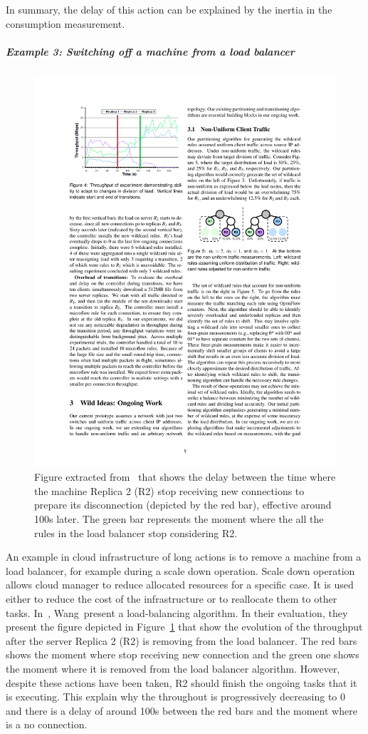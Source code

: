 In summary, the delay of this action can be explained by the inertia in the consumption measurement.

\subparagraph{Example 3: Switching off a machine from a load balancer}
\begin{figure}
	\centering
	\includegraphics[width=0.5\linewidth]{img/chapt-tkm/intro/load-balencer}
	\caption{Figure extracted from~\cite{DBLP:conf/nsdi/WangBR11} that shows the delay between the time where the machine Replica 2 (R2) stop receiving new connections to prepare its disconnection (depicted by the red bar), effective around 100s later. The green bar represents the moment where the all the rules in the load balancer stop considering R2.}
	\label{fig:tkm:intro:example-load-balencer}
	
\end{figure}


An example in cloud infrastructure of long actions is to remove a machine from a load balancer, for example during a scale down operation.
Scale down operation allows cloud manager to reduce allocated resources for a specific case.
It is used either to reduce the cost of the infrastructure or to reallocate them to other tasks.
In~\cite{DBLP:conf/nsdi/WangBR11}, Wang~\etal present a load-balancing algorithm.
In their evaluation, they present the figure depicted in Figure~\ref{fig:tkm:intro:example-load-balencer} that show the evolution of the throughput after the server Replica 2 (R2) is removing from the load balancer.
The red bars shows the moment where stop receiving new connection and the green one shows the moment where it is removed from the load balancer algorithm.
However, despite these actions have been taken, R2 should finish the ongoing tasks that it is executing.
This explain why the throughout is progressively decreasing to 0 and there is a delay of around 100s between the red bars and the moment where is a no connection.

